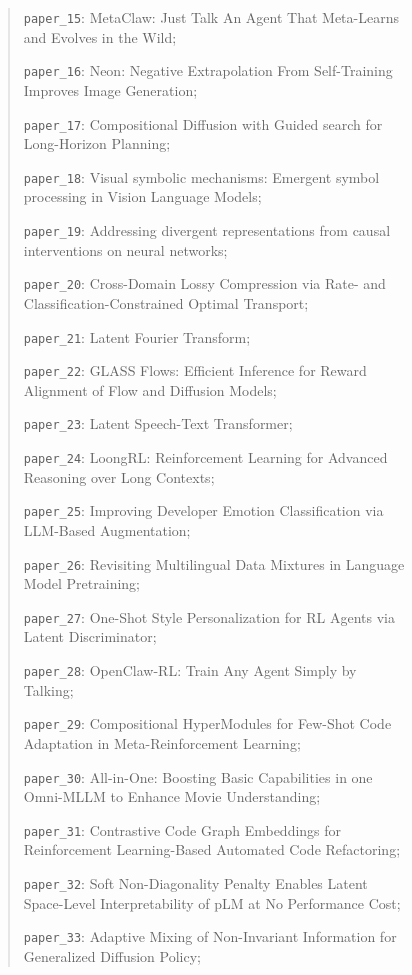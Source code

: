 \begin{figure}[h]
{\begin{quote}
    \texttt{paper\_15}: MetaClaw: Just Talk An Agent That Meta-Learns and Evolves in the Wild;\par
    \texttt{paper\_16}: Neon: Negative Extrapolation From Self-Training Improves Image Generation;\par
    \texttt{paper\_17}: Compositional Diffusion with Guided search for Long-Horizon Planning;\par
    \texttt{paper\_18}: Visual symbolic mechanisms: Emergent symbol processing in Vision Language Models;\par
    \texttt{paper\_19}: Addressing divergent representations from causal interventions on neural networks;\par
    \texttt{paper\_20}: Cross-Domain Lossy Compression via Rate- and Classification-Constrained Optimal Transport;\par
    \texttt{paper\_21}: Latent Fourier Transform;\par
    \texttt{paper\_22}: GLASS Flows: Efficient Inference for Reward Alignment of Flow and Diffusion Models;\par
    \texttt{paper\_23}: Latent Speech-Text Transformer;\par
    \texttt{paper\_24}: LoongRL: Reinforcement Learning for Advanced Reasoning over Long Contexts;\par
    \texttt{paper\_25}: Improving Developer Emotion Classification via LLM-Based Augmentation;\par
    \texttt{paper\_26}: Revisiting Multilingual Data Mixtures in Language Model Pretraining;\par
    \texttt{paper\_27}: One-Shot Style Personalization for RL Agents via Latent Discriminator;\par
    \texttt{paper\_28}: OpenClaw-RL: Train Any Agent Simply by Talking;\par
    \texttt{paper\_29}: Compositional HyperModules for Few-Shot Code Adaptation in Meta-Reinforcement Learning;\par
    \texttt{paper\_30}: All-in-One: Boosting Basic Capabilities in one Omni-MLLM to Enhance Movie Understanding;\par
    \texttt{paper\_31}: Contrastive Code Graph Embeddings for Reinforcement Learning-Based Automated Code Refactoring;\par
    \texttt{paper\_32}: Soft Non-Diagonality Penalty Enables Latent Space-Level Interpretability of pLM at No Performance Cost;\par
    \texttt{paper\_33}: Adaptive Mixing of Non-Invariant Information for Generalized Diffusion Policy;\par

\end{quote}}
\end{figure}
